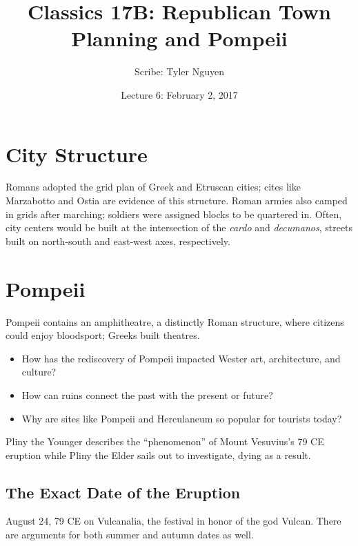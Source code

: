 \documentclass{article}
\begin{document}
\title{Classics 17B: Republican Town Planning and Pompeii}
\author{Scribe: Tyler Nguyen}
\date{Lecture 6: February 2, 2017}
\maketitle
\section{City Structure}
Romans adopted the grid plan of Greek and Etruscan cities; cites like Marzabotto and Ostia are evidence of this structure.  Roman armies also camped in grids after marching; soldiers were assigned blocks to be quartered in.  Often, city centers would be built at the intersection of the \textit{cardo} and \textit{decumanos}, streets built on north-south and east-west axes, respectively.
\section{Pompeii}
Pompeii contains an amphitheatre, a distinctly Roman structure, where citizens could enjoy bloodsport; Greeks built theatres.
\begin{itemize}
\item How has the rediscovery of Pompeii impacted Wester art, architecture, and culture?
\item How can ruins connect the past with the present or future?
\item Why are sites like Pompeii and Herculaneum so popular for tourists today?
\end{itemize}
Pliny the Younger describes the ``phenomenon'' of Mount Vesuvius's 79 CE eruption while Pliny the Elder sails out to investigate, dying as a result.
\subsection{The Exact Date of the Eruption}
August 24, 79 CE on Vulcanalia, the festival in honor of the god Vulcan.  There are arguments for both summer and autumn dates as well.
\end{document}
